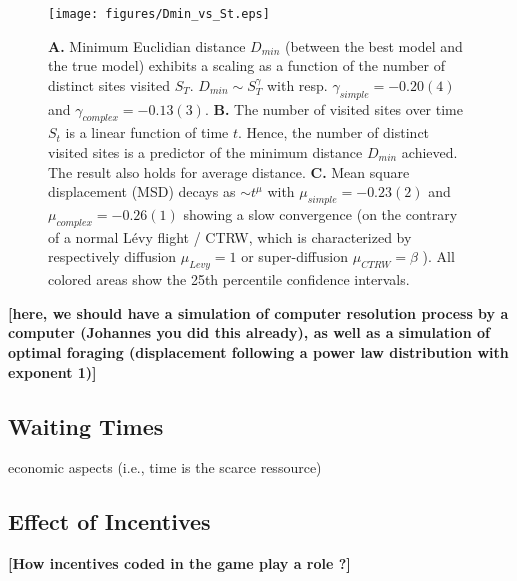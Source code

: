 \begin{figure}[h!]
\begin{center}
\texttt{[image: figures/Dmin\_vs\_St.eps]}
\caption{{\bf A.} Minimum Euclidian distance $D_{min}$ (between the best model and the true model) exhibits a scaling as a function of the number of distinct sites visited $S_{T}$. $D_{min} \sim S_{T}^{\gamma}$ with resp. $\gamma_{simple} = -0.20(4)$ and $\gamma_{complex} = - 0.13(3)$. {\bf B.}  The number of visited sites over time $S_t$ is a linear function of time $t$. Hence, the number of distinct visited sites is a predictor of the minimum distance $D_{min}$ achieved. The result also holds for average distance. {\bf C.}  Mean square displacement (MSD) decays as $\sim t^{\mu}$ with $\mu_{simple} =-0.23(2)$ and $\mu_{complex} =- 0.26(1)$ showing a slow convergence (on the contrary of a normal L\'evy flight / CTRW, which is characterized by respectively diffusion $\mu_{Levy} = 1$ or super-diffusion $\mu_{CTRW} = \beta$ \cite{21,23}). All colored areas show the 25th percentile confidence intervals.}
\label{fig:Dmin_vs_St}
\end{center}
\end{figure}


{\bf [here, we should have a simulation of computer resolution process by a computer (Johannes you did this already), as well as a simulation of optimal foraging (displacement following a power law distribution with exponent 1)]}


\subsection{Waiting Times}

economic aspects (i.e., time is the scarce ressource)

\subsection{Effect of Incentives}

{\bf [How incentives coded in the game play a role ?]}
